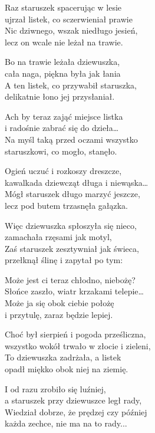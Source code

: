 \begin{text}
	Raz staruszek spacerując w lesie\\
	ujrzał listek, co sczerwieniał prawie\\
	Nic dziwnego, wszak niedługo jesień,\\
	lecz on wcale nie leżał na trawie.
	
	\vin Bo na trawie leżała dziewuszka,\\
	\vin cała naga, piękna była jak łania\\
	\vin A ten listek, co przywabił staruszka,\\
	\vin delikatnie łono jej przysłaniał.
	
	Ach by teraz zająć miejsce listka\\
	i radośnie zabrać się do dzieła…\\
	Na myśl taką przed oczami wszystko\\
	staruszkowi, co mogło, stanęło.
	
	\vin Ogień uczuć i rozkoszy dreszcze,\\
	\vin kawalkada dziewcząt długa i niewąska…\\
	\vin Mógł staruszek długo marzyć jeszcze,\\
	\vin lecz pod butem trzasnęła gałązka.
	
	Więc dziewuszka spłoszyła się nieco,\\
	zamachała rzęsami jak motyl,\\
	Zaś staruszek zesztywniał jak świeca,\\
	przełknął ślinę i zapytał po tym:
	
	\vin Może jest ci teraz chłodno, niebożę?\\
	\vin Słońce zaszło, wiatr krzakami telepie…\\
	\vin Może ja się obok ciebie położę\\
	\vin i przytulę, zaraz będzie lepiej.
	
	Choć był sierpień i pogoda prześliczna,\\
	wszystko wokół trwało w złocie i zieleni,\\
	To dziewuszka zadrżała, a listek\\
	opadł miękko obok niej na ziemię.
	
	\vin I od razu zrobiło się luźniej,\\
	\vin a staruszek przy dziewuszce legł rady,\\
	\vin Wiedział dobrze, że prędzej czy później\\
	\vin każda zechce, nie ma na to rady...  
\end{text}
